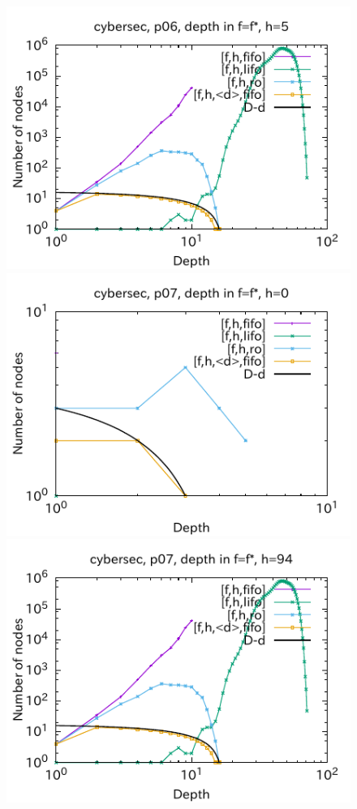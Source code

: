 \begin{figure}[htbp]
\includegraphics{img/output-lmcut/cybersec/p06-5.pdf}
\includegraphics{img/output-lmcut/cybersec/p07-0.pdf}
\includegraphics{img/output-lmcut/cybersec/p07-94.pdf}

\end{figure}
